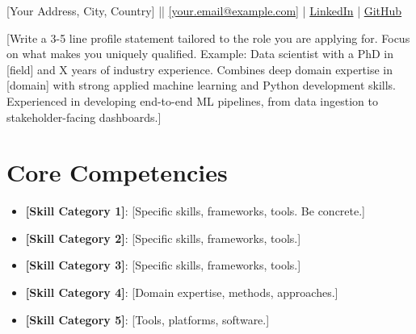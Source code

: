 \documentclass[11pt,a4paper,sans]{moderncv}
\begin{document}
\makecvtitle
\vspace{-12pt}
\begin{center}
\small
[Your Address, City, Country] \quad|\quad
[+XX XXXXXXXXXX] \quad|\quad
\href{mailto:[your.email@example.com]}{[your.email@example.com]} \quad|\quad
\href{[https://linkedin.com/in/your-profile]}{LinkedIn} \quad|\quad
\href{[https://github.com/your-username]}{GitHub}
\end{center}
\vspace{6pt}


\vspace{6pt}
\small{[Write a 3-5 line profile statement tailored to the role you are applying for. Focus on what makes you uniquely qualified. Example: Data scientist with a PhD in [field] and X years of industry experience. Combines deep domain expertise in [domain] with strong applied machine learning and Python development skills. Experienced in developing end-to-end ML pipelines, from data ingestion to stakeholder-facing dashboards.]}


\section{Core Competencies}
\vspace{1pt}
\begin{itemize}

\item \textbf{[Skill Category 1]}: [Specific skills, frameworks, tools. Be concrete.]

\item \textbf{[Skill Category 2]}: [Specific skills, frameworks, tools.]

\item \textbf{[Skill Category 3]}: [Specific skills, frameworks, tools.]

\item \textbf{[Skill Category 4]}: [Domain expertise, methods, approaches.]

\item \textbf{[Skill Category 5]}: [Tools, platforms, software.]

\end{itemize}
\end{document}
